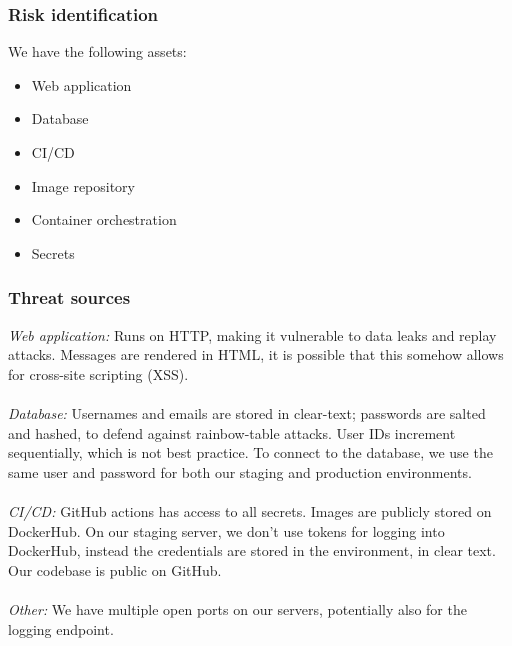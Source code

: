 
\subsubsection {Risk identification}
We have the following assets: 
\begin{itemize}
    \item Web application
    \item Database
    \item CI/CD
    \item Image repository
    \item Container orchestration
    \item Secrets
\end{itemize}

\subsubsection{Threat sources}

\textit{Web application:} Runs on HTTP, making it vulnerable to data leaks and replay attacks. Messages are rendered in HTML, it is possible that this somehow allows for cross-site scripting (XSS).\\\\
\textit{Database:} Usernames and emails are stored in clear-text; passwords are salted and hashed, to defend against rainbow-table attacks.
User IDs increment sequentially, which is not best practice. To connect to the database, we use the same user and password for both our staging and production environments.\\\\
\textit{CI/CD:} GitHub actions has access to all secrets. Images are publicly stored on DockerHub. On our staging server, we don’t use tokens for logging into DockerHub, instead the credentials are stored in the environment, in clear text. Our codebase is public on GitHub.\\\\
\noindent\textit{Other:} We have multiple open ports on our servers, potentially also for the logging endpoint.\\

